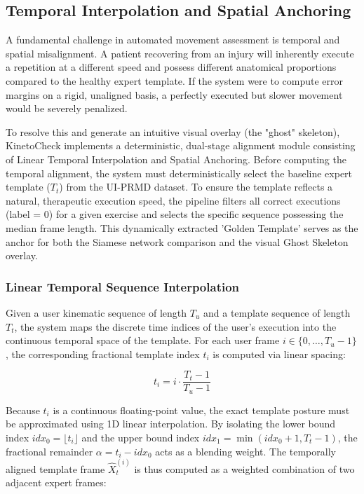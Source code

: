 

\subsection{Temporal Interpolation and Spatial Anchoring}
A fundamental challenge in automated movement assessment is temporal and spatial misalignment. A patient recovering from an injury will inherently execute a repetition at a different speed and possess different anatomical proportions compared to the healthy expert template. If the system were to compute error margins on a rigid, unaligned basis, a perfectly executed but slower movement would be severely penalized.

To resolve this and generate an intuitive visual overlay (the "ghost" skeleton), KinetoCheck implements a deterministic, dual-stage alignment module consisting of Linear Temporal Interpolation and Spatial Anchoring.
Before computing the temporal alignment, the system must deterministically select the baseline expert template ($T_t$) from the UI-PRMD dataset. To ensure the template reflects a natural, therapeutic execution speed, the pipeline filters all correct executions (label = 0) for a given exercise and selects the specific sequence possessing the median frame length. This dynamically extracted 'Golden Template' serves as the anchor for both the Siamese network comparison and the visual Ghost Skeleton overlay.
\subsubsection*{Linear Temporal Sequence Interpolation}
Given a user kinematic sequence of length $T_u$ and a template sequence of length $T_t$, the system maps the discrete time indices of the user's execution into the continuous temporal space of the template. For each user frame $i \in \{0, \dots, T_u - 1\}$, the corresponding fractional template index $t_i$ is computed via linear spacing:

\begin{equation}
t_i = i \cdot \frac{T_t - 1}{T_u - 1}
\end{equation}

Because $t_i$ is a continuous floating-point value, the exact template posture must be approximated using 1D linear interpolation. By isolating the lower bound index $idx_0 = \lfloor t_i \rfloor$ and the upper bound index $idx_1 = \min(idx_0 + 1, T_t - 1)$, the fractional remainder $\alpha = t_i - idx_0$ acts as a blending weight. The temporally aligned template frame $\hat{X}_t^{(i)}$ is thus computed as a weighted combination of two adjacent expert frames:

